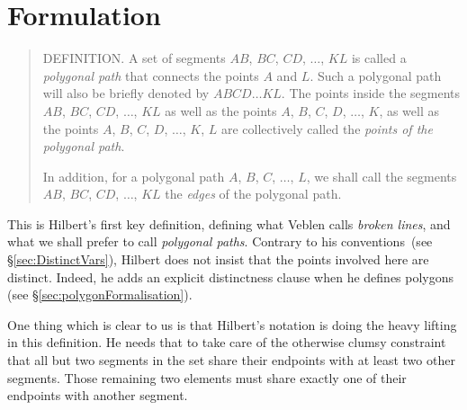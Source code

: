 


\section{Formulation}\label{sec:JordanFormulation}
\begin{quote}
  DEFINITION. A set of segments $AB$, $BC$, $CD$, $\ldots$, $KL$ is called a \emph{polygonal path} that connects the points $A$ and $L$. Such a polygonal path will also be briefly denoted by $ABCD\ldots KL$. The points inside the segments $AB$, $BC$, $CD$, $\ldots$, $KL$ as well as the points $A$, $B$, $C$, $D$, $\ldots$, $K$, as well as the points $A$, $B$, $C$, $D$, $\ldots$, $K$, $L$ are collectively called the \emph{points of the polygonal path}. 

In addition, for a polygonal path $A$, $B$, $C$, $\ldots$, $L$, we shall call the segments $AB$, $BC$, $CD$, $\dots$, $KL$ the \emph{edges} of the polygonal path.

\end{quote}
This is Hilbert's first key definition, defining what Veblen calls \emph{broken lines}, and what we shall prefer to call \emph{polygonal paths}. Contrary to his conventions~(see \S\ref{sec:DistinctVars}), Hilbert does not insist that the points involved here are distinct. Indeed, he adds an explicit distinctness clause when he defines polygons (see \S\ref{sec:polygonFormalisation}).

One thing which is clear to us is that Hilbert's notation is doing the heavy lifting in this definition. He needs that to take care of the otherwise clumsy constraint that all but two segments in the set share their endpoints with at least two other segments. Those remaining two elements must share exactly one of their endpoints with another segment.

